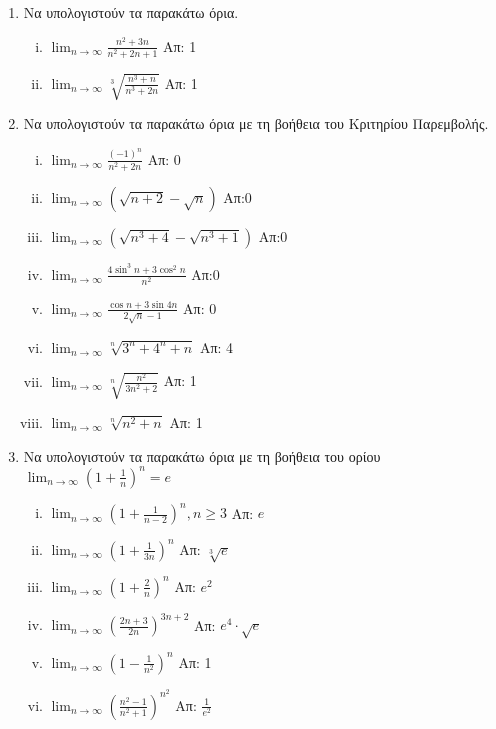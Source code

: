 \begin{enumerate}

  \item Να υπολογιστούν τα παρακάτω όρια.
    \begin{enumerate}[i)]
      \item $ \lim_{n \to \infty} \frac{n^{2}+3n}{n^{2}+2n+1} $ \hfill Απ: 1 
      \item $ \lim_{n \to \infty} \sqrt[3]{\frac{n^{3}+n}{n^{3}+2n}} $ 
        \hfill Απ: 1 
    \end{enumerate}

  \item Να υπολογιστούν τα παρακάτω όρια με τη βοήθεια του Κριτηρίου 
    Παρεμβολής.

    \begin{enumerate}[i)]
      \item $ \lim_{n \to \infty} \frac{(-1)^{n}}{n^{2}+2n}  $ \hfill Απ: 0  
      \item $ \lim_{n \to \infty} (\sqrt{n+2} - \sqrt{n})  $ \hfill Απ:0
      \item $ \lim_{n \to \infty} (\sqrt{n^{3}+4} - \sqrt{n^{3}+1})  $ \hfill Απ:0
      \item $ \lim_{n \to \infty} \frac{4 \sin^{3}{n} + 3 \cos^{2}{n}}{n^{2}} $ 
        \hfill Απ:0
      \item $ \lim_{n \to \infty} \frac{\cos{n} + 3 \sin{4n}}{ 2
        \sqrt{n} -1} $ \hfill Απ: 0  
      \item $ \lim_{n \to \infty} \sqrt[n]{3^{n}+4^{n}+n} $ \hfill Απ: 4 
      \item $ \lim_{n \to \infty} \sqrt[n]{\frac{n^{2}}{3n^{2}+2}} $ \hfill Απ: 1 
      \item $ \lim_{n \to \infty} \sqrt[n]{n^{2}+n} $ \hfill Απ: 1 
    \end{enumerate}

  \item Να υπολογιστούν τα παρακάτω όρια με τη βοήθεια του ορίου 
    $ \lim_{n \to \infty} \left(1+ \frac{1}{n}\right)^{n}=e $

    \begin{enumerate}[i)]
      \item $ \lim_{n \to \infty} \left(1+ \frac{1}{n-2}\right)^{n}, 
        n \geq 3 $ 
        \hfill Απ: $e$  
      \item $ \lim_{n \to \infty} \left(1 + \frac{1}{3n}\right)^{n} $ 
        \hfill Απ: $ \sqrt[3]{e} $ 
      \item $ \lim_{n \to \infty} \left(1+ \frac{2}{n}\right)^{n} $ 
        \hfill Απ: $ e^{2} $ 
      \item $ \lim_{n \to \infty} \left(\frac{2n +3}{2n} \right)^{3n+2}  $
        \hfill Απ: $ e^{4}\cdot \sqrt{e} $ 
      \item $ \lim_{n \to \infty}\left(1-\frac{1}{n^{2}} \right)^{n} $ 
        \hfill Απ: 1 
      \item $ \lim_{n \to \infty} \left(\frac{n^{2}-1}{n^{2}+1} \right)^{n^{2}} $
        \hfill Απ: $ \frac{1}{e^{2}} $ 
    \end{enumerate}
\end{enumerate}




